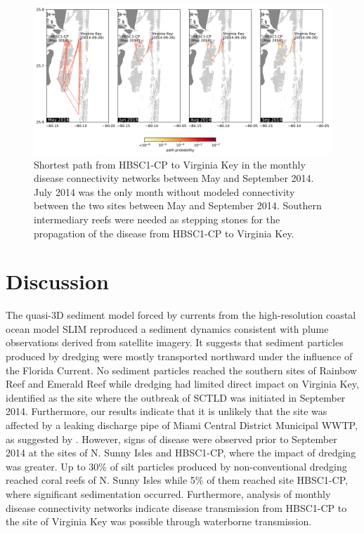 \documentclass[preprint,12pt,authoryear]{elsarticle}
\begin{document}
\begin{figure}
    \centering
    \includegraphics[width=\textwidth]{figures/fig_paths.png}
    \caption{Shortest path from HBSC1-CP to Virginia Key in the monthly disease connectivity networks between May and September 2014. July 2014 was the only month without modeled connectivity between the two sites between May and September 2014. Southern intermediary reefs were needed as stepping stones for the propagation of the disease from HBSC1-CP to Virginia Key.}
    \label{fig:onset_path}
\end{figure}

\section{Discussion}

The quasi-3D sediment model forced by currents from the high-resolution coastal ocean model SLIM reproduced a sediment dynamics consistent with plume observations derived from satellite imagery. It suggests that sediment particles produced by dredging were mostly transported northward under the influence of the Florida Current. No sediment particles reached the southern sites of Rainbow Reef and Emerald Reef while dredging had limited direct impact on Virginia Key, identified as the site where the outbreak of SCTLD was initiated in September 2014. Furthermore, our results indicate that it is unlikely that the site was affected by a leaking discharge pipe of Miami Central District Municipal WWTP, as suggested by \cite{gintert2019regional}. However, signs of disease were observed prior to September 2014 at the sites of N. Sunny Isles and HBSC1-CP, where the impact of dredging was greater. Up to 30\% of silt particles produced by non-conventional dredging reached coral reefs of N. Sunny Isles while 5\% of them reached site HBSC1-CP, where significant sedimentation occurred. Furthermore, analysis of monthly disease connectivity networks indicate disease transmission from HBSC1-CP to the site of Virginia Key was possible through waterborne transmission.   
\end{document}
